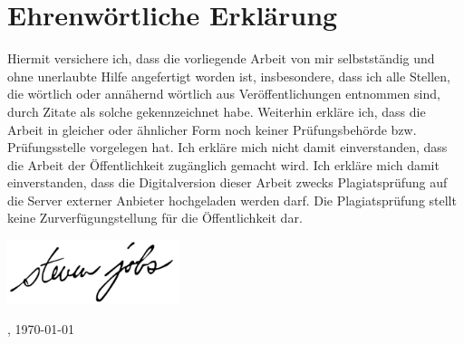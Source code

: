 \section*{Ehrenwörtliche Erklärung}
    Hiermit versichere ich, dass die vorliegende Arbeit von mir selbstständig und ohne unerlaubte Hilfe angefertigt worden ist, insbesondere, dass ich alle Stellen, die wörtlich oder annähernd wörtlich aus Veröffentlichungen entnommen sind, durch Zitate als solche gekennzeichnet habe.
    Weiterhin erkläre ich, dass die Arbeit in gleicher oder ähnlicher Form noch keiner Prüfungsbehörde bzw. Prüfungsstelle vorgelegen hat.
    \newline
    Ich erkläre mich nicht damit einverstanden, dass die Arbeit der Öffentlichkeit zugänglich gemacht wird.
    Ich erkläre mich damit einverstanden, dass die Digitalversion dieser Arbeit zwecks Plagiatsprüfung auf die Server externer Anbieter hochgeladen werden darf.
    Die Plagiatsprüfung stellt keine Zurverfügungstellung für die Öffentlichkeit dar.
    \newline

    \begin{flushright}
        \includegraphics[width=5cm]{abbildungen/unterschrift.png}
    \end{flushright}
    \begin{minipage}{0.48\textwidth}
        \begin{flushleft}
            \metaOrt{}, \today
        \end{flushleft}
    \end{minipage}
    \begin{minipage}{0.48\textwidth}
        \begin{flushright}
            \metaAutor{}
        \end{flushright}
    \end{minipage}
